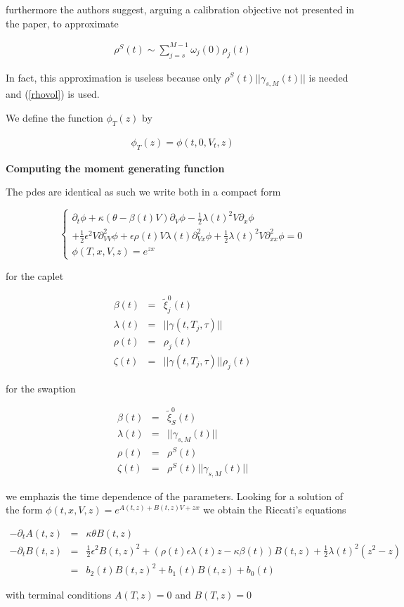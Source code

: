 \documentclass[10pt,a4paper,english,landscape]{slides}
\newcommand{\ban}{\begin{eqnarray*}}
\newcommand{\ean}{\end{eqnarray*}}
\newcommand{\ba}{\begin{eqnarray}}
\newcommand{\ea}{\end{eqnarray}}
\begin{document}
furthermore the authors suggest, arguing a calibration objective not presented in the paper, to approximate

\ban
\rho^S(t)\sim\sum_{j=s}^{M-1}\omega_j(0)\rho_j(t)
\ean
 
In fact, this approximation is useless because only  $\rho^S(t)||\gamma_{s,M}(t)||$ is needed and (\ref{rhovol}) is used.


We define the function $\phi_T(z)$ by 

\ba
\phi_T(z)=\phi(t,0,V_t,z) \label{fi1}
\ea


{\bf Computing the moment generating function}

The pdes are identical as such we write both in a compact form

\[
\left\lbrace 
\begin{array}{l}
\partial_t\phi  +\kappa(\theta - \beta(t)V)\partial_V\phi -\frac{1}{2}\lambda(t)^2V\partial_x\phi\\
+\frac{1}{2}\epsilon^2V\partial^2_{VV}\phi+\epsilon\rho(t)V\lambda(t)\partial^2_{Vx}\phi+\frac{1}{2}\lambda(t)^2V\partial^2_{xx}\phi=0\\
\phi(T,x,V,z)=e^{zx} 
\end{array}
\right. 
\]


for the caplet

\ban
\beta(t)&=& \tilde \xi_j^0(t) \\
\lambda(t)&=&||\gamma(t,T_j,\tau)|| \\
\rho(t)&=&\rho_j(t)\\
\zeta(t)&=&||\gamma(t,T_j,\tau)||  \rho_j(t)
\ean


for the swaption

\ban
\beta(t) &=& \tilde \xi_S^0(t)\\
\lambda(t) &=& ||\gamma_{s,M}(t)|| \\
\rho(t) &=& \rho^S(t)\\
\zeta(t)&=&\rho^S(t)||\gamma_{s,M}(t)|| 
\ean

we emphazis the time dependence of the parameters. Looking for a solution of the form $\phi(t,x,V,z)=e^{A(t,z)+B(t,z)V+zx}$ we obtain the Riccati's equations

\ba
-\partial_tA(t,z)&=&\kappa \theta B(t,z)\\
-\partial_tB(t,z)&=&\frac{1}{2}\epsilon^2B(t,z)^2+(\rho(t)\epsilon\lambda(t)z-\kappa\beta(t) )B(t,z)+\frac{1}{2}\lambda(t)^2(z^2-z)\\ \label{riccati1}
&=&b_2(t)B(t,z)^2+b_1(t)B(t,z)+b_0(t)
\ea

with terminal conditions $A(T,z)=0$ and $B(T,z)=0$
\end{document}
